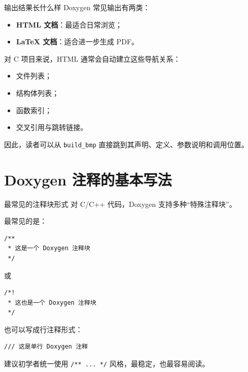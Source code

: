 \documentclass[aspectratio=169,11pt]{beamer}
\begin{document}
\begin{frame}{输出结果长什么样}
Doxygen 常见输出有两类：

\begin{itemize}
  \item \textbf{HTML 文档}：最适合日常浏览；
  \item \textbf{LaTeX 文档}：适合进一步生成 PDF。
\end{itemize}

\vspace{0.5em}
对 C 项目来说，HTML 通常会自动建立这些导航关系：
\begin{itemize}
  \item 文件列表；
  \item 结构体列表；
  \item 函数索引；
  \item 交叉引用与跳转链接。
\end{itemize}

\vspace{0.5em}
因此，读者可以从 \texttt{build\_bmp} 直接跳到其声明、定义、参数说明和调用位置。
\end{frame}

\section{Doxygen 注释的基本写法}

\begin{frame}[fragile]{最常见的注释块形式}
对 C/C++ 代码，Doxygen 支持多种“特殊注释块”。

最常见的是：

\begin{lstlisting}
/**
 * 这是一个 Doxygen 注释块
 */
\end{lstlisting}

或

\begin{lstlisting}
/*!
 * 这也是一个 Doxygen 注释块
 */
\end{lstlisting}

也可以写成行注释形式：

\begin{lstlisting}
/// 这是单行 Doxygen 注释
\end{lstlisting}

\vspace{0.5em}
建议初学者统一使用 \texttt{/** ... */} 风格，最稳定，也最容易阅读。
\end{frame}
\end{document}
